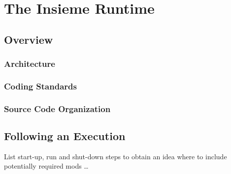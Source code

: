 \chapter{The Insieme Runtime} \label{cap:runtime}

\section{Overview}
\subsection{Architecture}
\subsection{Coding Standards}
\subsection{Source Code Organization}

\section{Following an Execution}
List start-up, run and shut-down steps to obtain an idea where to include
potentially required mods \ldots
